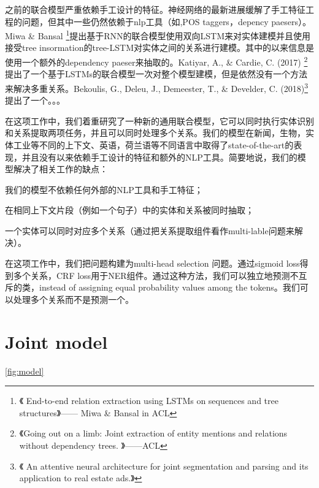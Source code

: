 \documentclass[a4paper,UTF8,no-math,zihao=-4]{ctexart}
\begin{document}
	之前的联合模型严重依赖手工设计的特征。神经网络的最新进展缓解了手工特征工程的问题，但其中一些仍然依赖于nlp工具（如,POS taggers，depency paesers）。Miwa \& Bansal \footnote{《 End-to-end relation extraction using LSTMs on sequences and tree structures》—— Miwa \& Bansal in ACL}提出基于RNN的联合模型使用双向LSTM来对实体建模并且使用接受tree insormation的tree-LSTM对实体之间的关系进行建模。其中的以来信息是使用一个额外的dependency paeser来抽取的。Katiyar, A., \& Cardie, C. (2017) \footnote{《Going out on a limb: Joint extraction of entity mentions and relations without dependency trees. 》——ACL}提出了一个基于LSTMs的联合模型一次对整个模型建模，但是依然没有一个方法来解决多重关系。Bekoulis, G., Deleu, J., Demeester, T., \& Develder, C. (2018)\footnote{《 An attentive neural architecture for joint segmentation and parsing and its application to real estate ads.》}提出了一个。。。
	
	在这项工作中，我们着重研究了一种新的通用联合模型，它可以同时执行实体识别和关系提取两项任务，并且可以同时处理多个关系。我们的模型在新闻，生物，实体工业等不同的上下文、英语，荷兰语等不同语言中取得了state-of-the-art的表现，并且没有以来依赖手工设计的特征和额外的NLP工具。简要地说，我们的模型解决了相关工作的缺点：\begin{enumerate*}[label=(\roman*)]
		\item 我们的模型不依赖任何外部的NLP工具和手工特征；
		\item 在相同上下文片段（例如一个句子）中的实体和关系被同时抽取；
		\item 一个实体可以同时对应多个关系（通过把关系提取组件看作multi-lable问题来解决）。 
	\end{enumerate*}
	
	在这项工作中，我们把问题构建为multi-head selection 问题。通过sigmoid loss得到多个关系，CRF loss用于NER组件。通过这种方法，我们可以独立地预测不互斥的类，instead of assigning equal probability values among the tokens。我们可以处理多个关系而不是预测一个。
	
	
	\section{Joint model}
	
	\autoref{fig:model}
	
\end{document}
